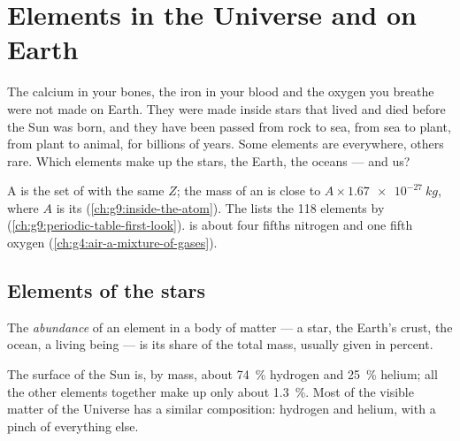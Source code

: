 \chapter{Elements in the Universe and on Earth}\label{ch:g9:elements-universe-earth}

The calcium in your bones, the iron in your blood and the oxygen you
breathe were not made on Earth. They were made inside stars that lived
and died before the Sun was born, and they have been passed from rock to
sea, from sea to plant, from plant to animal, for billions of years. Some
elements are everywhere, others rare. Which elements make up the stars,
the Earth, the oceans --- and us?

\begin{recall}
A  is the set of  with the same  $Z$;
the mass of an  is close to $A \times \qty{1.67e-27}{kg}$, where $A$
is its  (\cref{ch:g9:inside-the-atom}). The 
lists the 118 elements by 
(\cref{ch:g9:periodic-table-first-look}).  is about four fifths
nitrogen and one fifth oxygen (\cref{ch:g4:air-a-mixture-of-gases}).
\end{recall}

\section{Elements of the stars}

\begin{definition}[Abundance]\label{def:g9:elements-universe-earth:abundance}
The \emph{abundance} of an element in a body of matter
--- a star, the Earth's crust, the ocean, a living being --- is its share
of the total mass, usually given in percent.
\end{definition}

\begin{proposition}\label{prop:g9:elements-universe-earth:sun}
The surface of the Sun is, by mass, about \qty{74}{\percent} hydrogen
and \qty{25}{\percent} helium; all the other elements together make up
only about \qty{1.3}{\percent}. Most of the visible matter of the
Universe has a similar composition: hydrogen and helium, with a pinch of
everything else.
\end{proposition}

